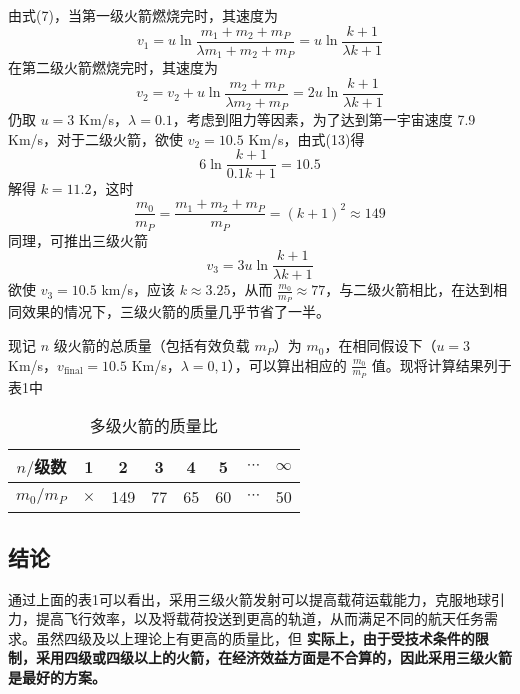 \documentclass[a4,10pt,zihao=-4]{ctexart}
\begin{document}
由式(7)，当第一级火箭燃烧完时，其速度为
\begin{equation*}
v_1 = u\ln\frac{m_1+m_2+m_P}{\lambda m_1+m_2+m_P} = u\ln\frac{k+1}{\lambda k+1}
\end{equation*}
在第二级火箭燃烧完时，其速度为
\begin{equation}
v_2 = v_2+u\ln \frac{m_2+m_P}{\lambda m_2+m_P} = 2u\ln\frac{k+1}{\lambda k+1}
\end{equation}
仍取 $u=3$ Km/s，$\lambda = 0.1$，考虑到阻力等因素，为了达到第一宇宙速度 7.9 Km/s，对于二级火箭，欲使 $v_2=10.5$ Km/s，由式(13)得
\begin{equation*}
6\ln\frac{k+1}{0.1k+1}= 10.5
\end{equation*}
解得 $k=11.2$，这时
\begin{equation*}
\frac{m_0}{m_P} = \frac{m_1+m_2+m_P}{m_P}=(k+1)^2\approx 149
\end{equation*}
同理，可推出三级火箭
\begin{equation*}
v_3 = 3u\ln\frac{k+1}{\lambda k+1}
\end{equation*}
欲使 $v_3=10.5$ km/s，应该 $k\approx 3.25$，从而 $\frac{m_0}{m_P}\approx 77$，与二级火箭相比，在达到相同效果的情况下，三级火箭的质量几乎节省了一半。

现记 $n$ 级火箭的总质量（包括有效负载 $m_P$）为 $m_0$，在相同假设下（$u = 3$ Km/s，$v_{\text{final}}=10.5$ Km/s，$\lambda = 0,1$），可以算出相应的 $\frac{m_0}{m_P}$ 值。现将计算结果列于表1中

\begin{table}[htbp]
    \centering
    \begin{tabular}{|c|c|c|c|c|c|c|c|}
        \hline
        $n/$级数 & 1 & 2 & 3 & 4 & 5 & $\cdots$ & $\infty$ \\
        \hline
        ${m_0}/{m_P}$ & $\times$ & 149 & 77 & 65 & 60 & $\cdots$ & 50 \\
        \hline
    \end{tabular}
    \caption{多级火箭的质量比}
\end{table}

\subsection{结论}
通过上面的表1可以看出，采用三级火箭发射可以提高载荷运载能力，克服地球引力，提高飞行效率，以及将载荷投送到更高的轨道，从而满足不同的航天任务需求。虽然四级及以上理论上有更高的质量比，但
\textbf{实际上，由于受技术条件的限制，采用四级或四级以上的火箭，在经济效益方面是不合算的，因此采用三级火箭是最好的方案。}
\end{document}
